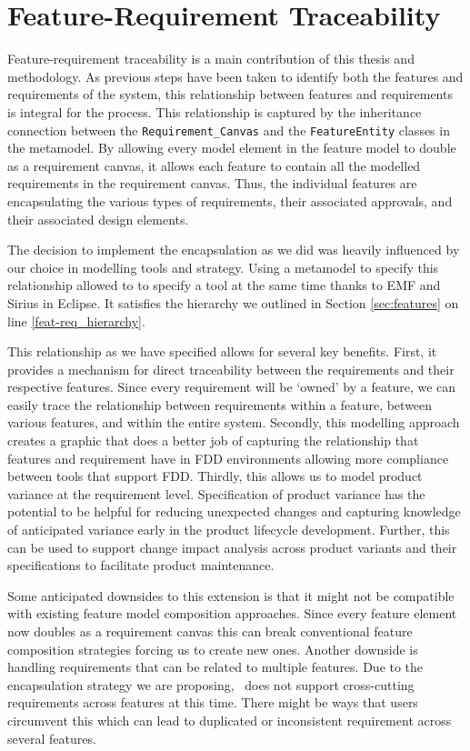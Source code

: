 \section{Feature-Requirement Traceability}
\label{sec:feat-req_traceability}

Feature-requirement traceability is a main contribution of this thesis and methodology. As previous steps have been taken to identify both the features and requirements of the system, this relationship between features and requirements is integral for the process. This relationship is captured by the inheritance connection between the \texttt{Requirement\_Canvas} and the \texttt{FeatureEntity} classes in the metamodel. By allowing every model element in the feature model to double as a requirement canvas, it allows each feature to contain all the modelled requirements in the requirement canvas. Thus, the individual features are encapsulating the various types of requirements, their associated approvals, and their associated design elements. 

The decision to implement the encapsulation as we did was heavily influenced by our choice in modelling tools and strategy. Using a metamodel to specify this relationship allowed to to specify a tool at the same time thanks to \ac{EMF} and Sirius in Eclipse. It satisfies the hierarchy we outlined in Section \ref{sec:features} on line \ref{feat-req_hierarchy}.

This relationship as we have specified allows for several key benefits. First, it provides a mechanism for direct traceability between the requirements and their respective features. Since every requirement will be `owned' by a feature, we can easily trace the relationship between requirements within a feature, between various features, and within the entire system. Secondly, this modelling approach creates a graphic that does a better job of capturing the relationship that features and requirement have in \ac{FDD} environments allowing more compliance between tools that support \ac{FDD}. Thirdly, this allows us to model product variance at the requirement level. Specification of product variance has the potential to be helpful for reducing unexpected changes and capturing knowledge of anticipated variance early in the product lifecycle development. Further, this can be used to support change impact analysis across product variants and their specifications to facilitate product maintenance. 

Some anticipated downsides to this extension is that it might not be compatible with existing feature model composition approaches. Since every feature element now doubles as a requirement canvas this can break conventional feature composition strategies forcing us to create new ones. Another downside is handling requirements that can be related to multiple features. Due to the encapsulation strategy we are proposing, \tool\ does not support cross-cutting requirements across features at this time. There might be ways that users circumvent this which can lead to duplicated or inconsistent requirement across several features. 

